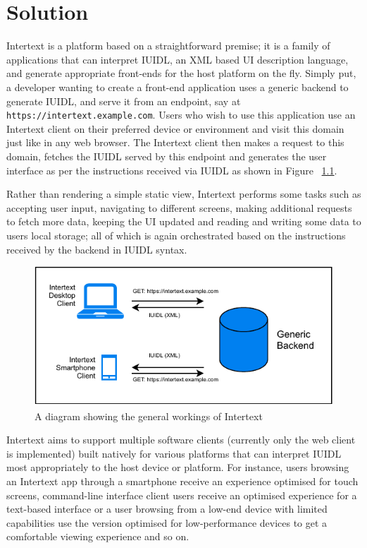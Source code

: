 
\chapter{Solution} \label{solution}


Intertext is a platform based on a straightforward premise; it is a family of applications that can interpret IUIDL, an XML based UI description language, and generate appropriate front-ends for the host platform on the fly. Simply put, a developer wanting to create a front-end application uses a generic backend to generate IUIDL, and serve it from an endpoint, say at \texttt{https://intertext.example.com}. Users who wish to use this application use an Intertext client on their preferred device or environment and visit this domain just like in any web browser. The Intertext client then makes a request to this domain, fetches the IUIDL served by this endpoint and generates the user interface as per the instructions received via IUIDL as shown in Figure ~\ref{fig:how_intertext_works}.


Rather than rendering a simple static view, Intertext performs some tasks such as accepting user input, navigating to different screens, making additional requests to fetch more data, keeping the UI updated and reading and writing some data to users local storage; all of which is again orchestrated based on the instructions received by the backend in IUIDL syntax.


\begin{figure}
  \centering
  \includegraphics[width=13cm]{thesis/paper/images/how_it_works.pdf}
  \caption{A diagram showing the general workings of Intertext}%
  \label{fig:how_intertext_works}%
\end{figure}


Intertext aims to support multiple software clients (currently only the web client is implemented) built natively for various platforms that can interpret IUIDL most appropriately to the host device or platform. For instance, users browsing an Intertext app through a smartphone receive an experience optimised for touch screens, command-line interface client users receive an optimised experience for a text-based interface or a user browsing from a low-end device with limited capabilities use the version optimised for low-performance devices to get a comfortable viewing experience and so on. 

